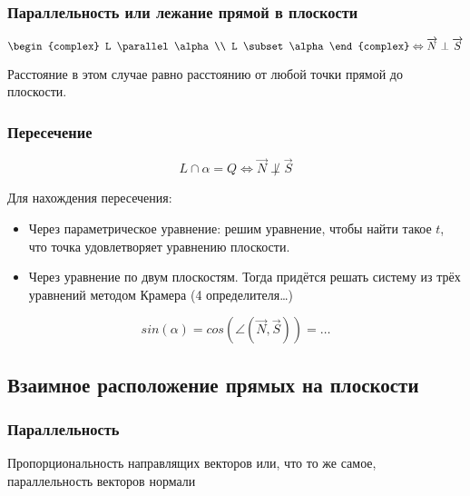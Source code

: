 \documentclass[12pt, a4paper]{article}
\begin{document}
    \subsubsection{Параллельность или лежание прямой в плоскости}

    \begin{equation}
        \begin{complex}
            L \parallel \alpha \\
            L \subset \alpha    
        \end{complex}
        \Leftrightarrow \vec{N} \perp \vec{S}
    \end{equation}

    Расстояние в этом случае равно расстоянию от любой точки прямой до плоскости.

    \subsubsection{Пересечение}
    \begin{equation}
        L \cap \alpha = Q \Leftrightarrow \vec{N} \not\perp \vec{S}
    \end{equation}

    Для нахождения пересечения:
    \begin{itemize}
        \item Через параметрическое уравнение: решим уравнение, чтобы найти такое $t$, что точка удовлетворяет уравнению плоскости.
        \item Через уравнение по двум плоскостям. Тогда придётся решать систему из трёх уравнений методом Крамера (4 определителя\dots)
    \end{itemize} 

    \begin{equation}
        sin(\alpha) = cos(\angle(\vec{N}, \vec{S})) = \dots
    \end{equation}


    \subsection{Взаимное расположение прямых на плоскости}

    \subsubsection{Параллельность}
    Пропорциональность направлящих векторов или, что то же самое, параллельность векторов нормали
\end{document}
